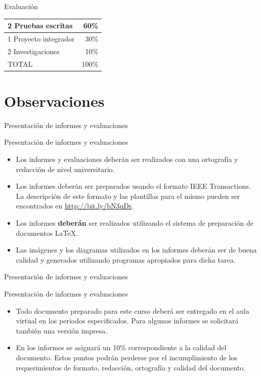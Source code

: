 \documentclass[handout,xcolor=dvipsnames]{beamer}
\newcommand{\pageframe}[1]{\frame{\begin{center}{ \Huge #1 }\end{center}}}
\begin{document}
\begin{frame}{Evaluación}
\begin{center}
\begin{tabular}{|l|r|}\hline
	2 Pruebas escritas	&	60\%\\\hline
	1 Proyecto integrador	&	30\%\\\hline
	2 Investigaciones	&	10\%\\\hline\hline
	TOTAL			&	100\%\\\hline
\end{tabular}
\end{center}
\end{frame}

\section{Observaciones}

\pageframe{Observaciones}


\begin{frame}{Presentación de informes y evaluaciones}
\begin{block}{Presentación de informes y evaluaciones}
  \begin{itemize}[<+->]
    \item Los informes y evaluaciones deberán ser realizados con una ortografía y redacción de nivel universitario.
    \item Los informes deberán ser preparados usando el formato IEEE Transactions. La descripción de este formato y las plantillas para el mismo pueden ser encontrados en \url{http://bit.ly/bN3uDr}.
    \item Los informes \textbf{deberán} ser realizados utilizando el sistema de preparación de documentos \LaTeX.
    \item Las imágenes y los diagramas utilizados en los informes deberán ser de buena calidad y generados utilizando programas apropiados para dicha tarea.
  \end{itemize}
\end{block}
\end{frame}


\begin{frame}{Presentación de informes y evaluaciones}
\begin{block}{Presentación de informes y evaluaciones}
  \begin{itemize}[<+->]
    \item Todo documento preparado para este curso deberá ser entregado en el aula virtual en los periodos especificados. Para algunos informes se solicitará también una versión impresa.
    \item En los informes se asignará un 10\% correspondiente a la calidad del documento. Estos puntos podrán perderse por el incumplimiento de los requerimientos de formato, redacción, ortografía y calidad del documento.
  \end{itemize}
\end{block}
\end{frame}
\end{document}
